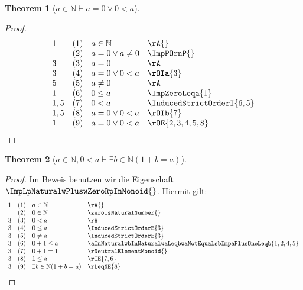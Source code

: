 \documentclass{book}
\theoremstyle{plain}
\newtheorem{theorem}{Theorem}
\theoremstyle{remark}
\theoremstyle{definition}
\begin{document}
\label{aInNaturalImpaEqualsZeroOrZeroLneqa}
\begin{theorem}[\(a\in\mathbb{N}\vdash a=0\lor 0<a\)]
\end{theorem}
\begin{proof}
\[
\begin{array}{llll}
            1 & (1) & a\in\mathbb{N}  & \rA{} \\
              & (2) & a=0\lor a\neq 0 & \ImpPOrnP{} \\
            3 & (3) & a=0 & \rA \\
            3 & (4) & a=0\lor 0<a & \rOIa{3} \\
            5 & (5) & a\neq 0 & \rA \\
            1 & (6) & 0\leq a & \ImpZeroLeqa{1} \\
            1,5 & (7) & 0<a & \InducedStrictOrderI{6,5} \\
            1,5 & (8) & a=0\lor 0<a & \rOIb{7} \\
            1  & (9) & a=0\lor 0<a & \rOE{2,3,4,5,8} \\
\end{array}
\]
\end{proof}

\label{aInNaturalwZeroLneqaImpExbInNaturalLpOnePlusbEqualsaRp}
\begin{theorem}[\(a\in\mathbb{N},0<a\vdash\exists b\in\mathbb{N}(1+b=a)\)]
\end{theorem}
\begin{proof}
        Im Beweis benutzen wir die Eigenschaft \(\ImpLpNaturalwPluswZeroRpInMonoid{}\). Hiermit gilt:
\[
\begin{array}{llll}
            1 & (1) & a\in\mathbb{N}  & \rA{} \\
              & (2) & 0\in\mathbb{N}  & \zeroIsNaturalNumber{} \\
            3 & (3) & 0<a & \rA \\
            3 & (4) & 0\leq a & \InducedStrictOrderE{3} \\
            3 & (5) & 0\neq a & \InducedStrictOrderE{3} \\
            3 & (6) & 0+1\leq a & \aInNaturalwbInNaturalwaLeqbwaNotEqualsbImpaPlusOneLeqb{1,2,4,5} \\
            3 & (7) & 0+1=1 & \rNeutralElementMonoid{} \\
            3 & (8) & 1\leq a & \rIE{7,6} \\
            3 & (9) & \exists b\in\mathbb{N}(1+b=a) & \rLeqNE{8} \\
\end{array}
\]
\end{proof}
\end{document}
